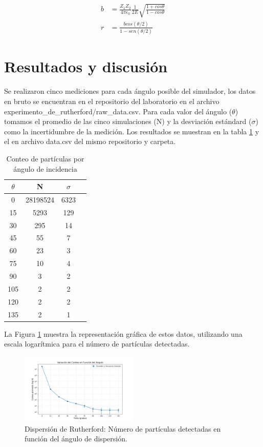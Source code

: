 \documentclass[twocolumn,a4paper,11pt]{scrartcl}
\begin{document}
\begin{equation}
  \begin{aligned}
    b &= \frac{Z_1Z_2}{4\pi \epsilon_0} \frac{1}{2E} \sqrt{\frac{1 + cos\theta}{1-cos\theta}} \\
    r &= \frac{b cos(\theta /2)}{1-sen(\theta /2)}
  \end{aligned}
  \label{eq:radio_nuclear}
\end{equation}

\section{Resultados y discusión}

Se realizaron cinco mediciones para cada ángulo posible del simulador, los datos en bruto se encuentran en el repositorio del laboratorio \cite{BrianDL_laboratorio} en el archivo experimento\_de\_rutherford/raw\_data.csv. 
Para cada valor del ángulo ($\theta$) tomamos el promedio de las cinco simulaciones (N) y la desviación estándard ($\sigma$) como la incertidumbre de la medición. Los resultados se muestran en la tabla \ref{tab:data1} y el en archivo data.csv del mismo repositorio y carpeta.

\begin{table}[h]
  \centering
  \begin{tabular}{cccc}
  \hline
  $\theta$ & N & $\sigma$ \\
  \hline
  0 & 28198524 & 6323 \\
  15 & 5293 & 129 \\
  30 & 295 & 14 \\
  45 & 55 & 7 \\
  60 & 23 & 3 \\
  75 & 10 & 4 \\
  90 & 3 & 2 \\
  105 & 2 & 2 \\
  120 & 2 & 2 \\
  135 & 2 & 1 \\
  \hline
  \end{tabular}
  \caption{Conteo de partículas por ángulo de incidencia}
  \label{tab:data1}
  \end{table}

La Figura \ref{fig:rutherford_dispersion} muestra la representación gráfica de estos datos, utilizando una escala logarítmica para el número de partículas detectadas.

\begin{figure}[h]
\centering
\includegraphics[width=0.5\textwidth]{data.png}
\caption{Dispersión de Rutherford: Número de partículas detectadas en función del ángulo de dispersión.}
\label{fig:rutherford_dispersion}
\end{figure}
\end{document}
